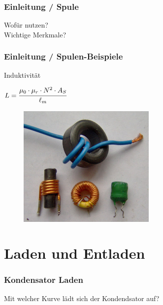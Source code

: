 \begin{frame}
  \frametitle{Einleitung / Spule}
  \begin{center}
    \Large{Wofür nutzen?}\\
    \Large{Wichtige Merkmale?}
  \end{center}
\end{frame}

\begin{frame}
  \frametitle{Einleitung / Spulen-Beispiele}
  \begin{block}{Induktivität}
    \begin{center}
      \Large{$L = \cfrac{\mu_0 \cdot \mu_r \cdot N^2 \cdot A_S}{\ell_m}$}
    \end{center}
  \end{block}
  \begin{center}
    \begin{figure}
      \includegraphics[width=0.6\textwidth,height=0.5\textheight,keepaspectratio]{a03/Spule.jpg}
    \end{figure}
  \end{center}
\end{frame}


\section*{Laden und Entladen}

\begin{frame}
  \frametitle{Kondensator Laden}
  \begin{center}
    \Large{Mit welcher Kurve lädt sich der Kondendsator auf?}\\
  \end{center}
\end{frame}

